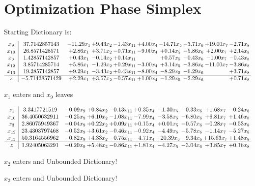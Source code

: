 \documentclass[9pt]{article}
\begin{document}
\section{Optimization Phase Simplex}
Starting Dictionary is:
\[\begin{array}{c| c c@{\hskip 2pt} c@{\hskip 2pt} c@{\hskip 2pt} c@{\hskip 2pt} c@{\hskip 2pt} c@{\hskip 2pt} c@{\hskip 2pt} c@{\hskip 2pt} }
 x_{9}   &  37.7142857143 & -11.29 x_{1} & +  9.43 x_{2} & -1.43 x_{11} & +  4.00 x_{4} & -14.71 x_{5} & -3.71 x_{6} & + 19.00 x_{7} & -2.71 x_{8}\\
 x_{10}   &  26.8571428571 & +  2.86 x_{1} & +  3.71 x_{2} & -0.71 x_{11} & -9.00 x_{4} & +  0.14 x_{5} & -5.86 x_{6} & +  2.00 x_{7} & +  2.14 x_{8}\\
 x_{3}   &  1.42857142857 & +  0.43 x_{1} & -0.14 x_{2} & +  0.14 x_{11} &   & +  0.57 x_{5} & -0.43 x_{6} & -1.00 x_{7} & -0.43 x_{8}\\
 x_{12}   &  3.85714285714 & +  5.86 x_{1} & -1.29 x_{2} & +  0.29 x_{11} & -3.00 x_{4} & +  3.14 x_{5} & -3.86 x_{6} & -11.00 x_{7} & -3.86 x_{8}\\
 x_{13}   &  19.2857142857 & +  9.29 x_{1} & -3.43 x_{2} & +  0.43 x_{11} & -8.00 x_{4} & -8.29 x_{5} & -6.29 x_{6} &   & +  3.71 x_{8}\\
\hline
z    &  -5.71428571429 & +  2.29 x_{1} & +  3.57 x_{2} & -0.57 x_{11} & +  1.00 x_{4} & -1.29 x_{5} & -2.29 x_{6} &   & +  0.71 x_{8}\\
\end{array}\]


 $ x_{1} $ enters and $ x_{9} $ leaves 

 \[\begin{array}{c| c c@{\hskip 2pt} c@{\hskip 2pt} c@{\hskip 2pt} c@{\hskip 2pt} c@{\hskip 2pt} c@{\hskip 2pt} c@{\hskip 2pt} c@{\hskip 2pt} }
 x_{1}   &  3.3417721519 & -0.09 x_{9} & +  0.84 x_{2} & -0.13 x_{11} & +  0.35 x_{4} & -1.30 x_{5} & -0.33 x_{6} & +  1.68 x_{7} & -0.24 x_{8}\\
 x_{10}   &  36.4050632911 & -0.25 x_{9} & +  6.10 x_{2} & -1.08 x_{11} & -7.99 x_{4} & -3.58 x_{5} & -6.80 x_{6} & +  6.81 x_{7} & +  1.46 x_{8}\\
 x_{3}   &  2.86075949367 & -0.04 x_{9} & +  0.22 x_{2} & +  0.09 x_{11} & +  0.15 x_{4} & +  0.01 x_{5} & -0.57 x_{6} & -0.28 x_{7} & -0.53 x_{8}\\
 x_{12}   &  23.4303797468 & -0.52 x_{9} & +  3.61 x_{2} & -0.46 x_{11} & -0.92 x_{4} & -4.49 x_{5} & -5.78 x_{6} & -1.14 x_{7} & -5.27 x_{8}\\
 x_{13}   &  50.3164556962 & -0.82 x_{9} & +  4.33 x_{2} & -0.75 x_{11} & -4.71 x_{4} & -20.39 x_{5} & -9.34 x_{6} & + 15.63 x_{7} & +  1.48 x_{8}\\
\hline
z    &  1.92405063291 & -0.20 x_{9} & +  5.48 x_{2} & -0.86 x_{11} & +  1.81 x_{4} & -4.27 x_{5} & -3.04 x_{6} & +  3.85 x_{7} & +  0.16 x_{8}\\
\end{array}\]


 $ x_{2} $ enters and Unbounded Dictionary!


 $ x_{2} $ enters and Unbounded Dictionary!
\end{document}
